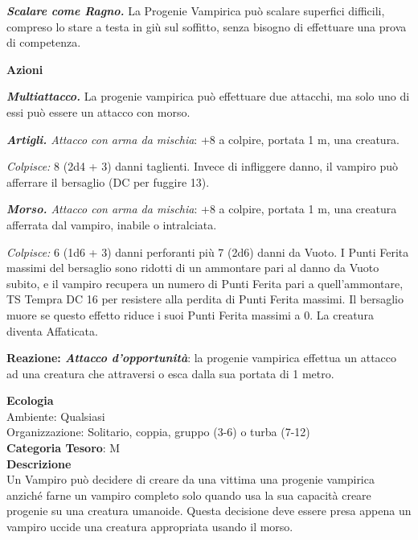 \begin{multicols}{2}
{\emph{\textbf{Scalare come Ragno.}} La Progenie Vampirica può scalare superfici difficili, compreso lo stare a testa in giù sul soffitto, senza bisogno di effettuare una prova di competenza.

\textbf{Azioni}

\emph{\textbf{Multiattacco.}} La progenie vampirica può effettuare due attacchi, ma solo uno di essi può essere un attacco con morso.

\emph{\textbf{Artigli.} Attacco con arma da mischia}: +8 a colpire, portata 1 m, una creatura.

\emph{Colpisce:} 8 (2d4 + 3) danni taglienti. Invece di infliggere danno, il vampiro può afferrare il bersaglio (DC per fuggire 13).

\emph{\textbf{Morso.} Attacco con arma da mischia}: +8 a colpire, portata 1 m, una creatura afferrata dal vampiro, inabile o intralciata.

\emph{Colpisce:} 6 (1d6 + 3) danni perforanti più 7 (2d6) danni da Vuoto. I Punti Ferita massimi del bersaglio sono ridotti di un ammontare pari al danno da Vuoto subito, e il vampiro recupera un numero di Punti Ferita pari a quell'ammontare, TS Tempra DC 16 per resistere alla perdita di Punti Ferita massimi. Il bersaglio muore se questo effetto riduce i suoi Punti Ferita massimi a 0. La creatura diventa Affaticata.

\textbf{Reazione: \emph{Attacco d'opportunità}}: la progenie vampirica effettua un attacco ad una creatura che attraversi o esca dalla sua portata di 1 metro.

\textbf{Ecologia}\\
Ambiente: Qualsiasi\\
Organizzazione: Solitario, coppia, gruppo (3-6) o turba (7-12)\\
\textbf{Categoria Tesoro}: M\\
\textbf{Descrizione}\\
Un Vampiro può decidere di creare da una vittima una progenie vampirica anziché farne un vampiro completo solo quando usa la sua capacità creare progenie su una creatura umanoide. Questa decisione deve essere presa appena un vampiro uccide una creatura appropriata usando il morso.

}
\end{multicols}

